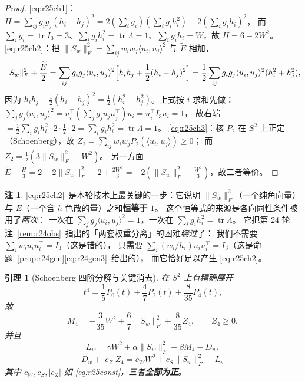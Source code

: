 \documentclass[UTF8,11pt]{ctexart}
\newtheorem{lemma}[theorem]{引理}
\theoremstyle{definition}
\newtheorem{remark}[theorem]{注}
\newcommand{\Lam}{\Lambda}
\newcommand{\tr}{\operatorname{tr}}
\begin{document}
\begin{proof}
\eqref{eq:r25ch1}：$H=\sum_{ij}g_ig_j(h_i-h_j)^2=2(\sum_ig_i)(\sum_ig_ih_i^2)-2(\sum_ig_ih_i)^2$，
而 $\sum_ig_i=\tr I_3=3$、$\sum_ig_ih_i^2=\tr\Lam=1$、$\sum_ig_ih_i=W$，故 $H=6-2W^2$。
\eqref{eq:r25ch2}：把 $\|S_w\|_F^2=\sum_{ij}w_iw_j\langle u_i,u_j\rangle^2$ 与 $\widetilde E$ 相加，
\[
\|S_w\|_F^2+\frac{\widetilde E}2
=\sum_{ij}g_ig_j\langle u_i,u_j\rangle^2\Bigl[h_ih_j+\frac12(h_i-h_j)^2\Bigr]
=\frac12\sum_{ij}g_ig_j\langle u_i,u_j\rangle^2(h_i^2+h_j^2),
\]
因为 $h_ih_j+\frac12(h_i-h_j)^2=\frac12(h_i^2+h_j^2)$。上式按 $i$ 求和先做：
$\sum_jg_j\langle u_i,u_j\rangle^2=u_i^\top(\sum_jg_ju_ju_j^\top)u_i=u_i^\top I_3u_i=1$，
故右端 $=\frac12\sum_ig_ih_i^2\cdot2\cdot\frac12\cdot2=\sum_ig_ih_i^2=\tr\Lam=1$。
\eqref{eq:r25ch3}：核 $P_2$ 在 $S^2$ 上正定（Schoenberg），故
$Z_2=\sum_{ij}w_iw_jP_2(\langle u_i,u_j\rangle)\ge0$；
而 $Z_2=\frac12(3\|S_w\|_F^2-W^2)$。
另一方面 $\widetilde E-\frac H3=2-2\|S_w\|_F^2-2+\frac{2W^2}3=-2(\|S_w\|_F^2-\frac{W^2}3)$，故二者等价。
\end{proof}

\begin{remark}
\eqref{eq:r25ch2}~是本轮技术上最关键的一步：它说明
$\|S_w\|_F^2$（一个纯角向量）与 $\widetilde E$（一个含 $h$-色散的量）之和\textbf{恒等于 $1$}。
这个恒等式的来源是各向同性条件被用了\emph{两次}：
一次在 $\sum_jg_j\langle u_i,u_j\rangle^2=1$，一次在 $\sum_ig_ih_i^2=\tr\Lam$。
它把第 24 轮注~\ref{rem:r24obs}~指出的「两套权重分离」的困难\emph{绕过}了：
我们不需要 $\sum_iw_iu_iu_i^\top=I_3$（这是错的），
只需要 $\sum_i(w_i/h_i)u_iu_i^\top=I_3$（这是命题~\ref{prop:r24gen}\eqref{eq:r24gen3}~给出的），
而它恰好足以产生 \eqref{eq:r25ch2}。
\end{remark}

\begin{lemma}[Schoenberg 四阶分解与关键消去]\label{lem:r25scho}
在 $S^2$ 上有精确展开
\begin{equation}\label{eq:r25scho1}
t^4=\frac15P_0(t)+\frac47P_2(t)+\frac8{35}P_4(t),
\end{equation}
故
\begin{equation}\label{eq:r25scho2}
M_4=-\frac3{35}W^2+\frac67\|S_w\|_F^2+\frac8{35}Z_4,\qquad Z_4\ge0 ,
\end{equation}
并且
\begin{equation}\label{eq:r25scho3}
L_w=\gamma W^2+\alpha\|S_w\|_F^2+\beta M_4-D_w ,
\end{equation}
\begin{equation}\label{eq:r25key}
\boxed{\;D_w+|c_Z|Z_4=c_WW^2+c_S\|S_w\|_F^2-L_w\;}
\end{equation}
其中 $c_W,c_S,|c_Z|$ 如 \eqref{eq:r25const}，三者\textbf{全部为正}。
\end{lemma}
\end{document}
